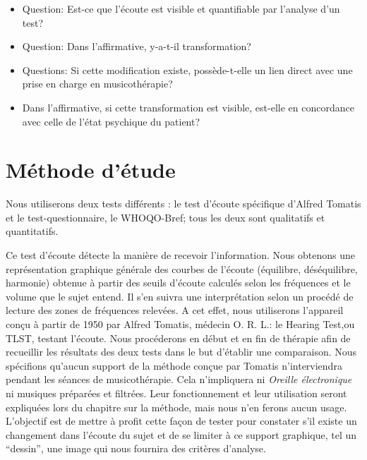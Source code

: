 
 \begin{itemize}
 \item  Question:
   Est-ce que l'écoute est visible et quantifiable par
          l'analyse d'un test?
 
 \end{itemize}
 	
 \begin{itemize}
 \item Question:
   Dans l'affirmative, y-a-t-il transformation?
   
\end{itemize}
 
\begin{itemize}
          
 \item Questions:
   Si cette modification existe, possède-t-elle un lien direct avec une prise en charge
  en musicothérapie?
  
  \item Dans l'affirmative, 
   si cette transformation est visible, est-elle en 
 	concordance 
 	avec celle de l'état psychique du patient?
        
 \end{itemize}

 






 

\section{Méthode d'étude}

	Nous utiliserons deux tests différents : 
	le test d'écoute spécifique d'Alfred Tomatis
	et le test-questionnaire, le WHOQO-Bref; tous les deux sont
        qualitatifs et quantitatifs.

        
        Ce test d'écoute détecte la manière de recevoir
        l'information. Nous obtenons une  
	représentation graphique générale des courbes de l'écoute
        (équilibre, déséquilibre, harmonie) obtenue à partir des seuils d'écoute
        calculés selon les fréquences et le volume que le sujet entend. Il s'en suivra une interprétation
        selon un procédé de lecture des zones de fréquences relevées.
	A cet effet, nous utiliserons l'appareil conçu à partir de 1950 par Alfred Tomatis, médecin
        O. R. L.: le Hearing Test,ou TLST, testant
        l'écoute.
	Nous procéderons en début et en fin de thérapie
        afin de recueillir les résultats des
        deux tests dans le but d'établir une comparaison.
        Nous spécifions qu'aucun support de la méthode conçue par
        Tomatis n'interviendra pendant les séances de musicothérapie.
        Cela n'impliquera ni 
\textsl{Oreille
	électronique} ni musiques préparées et filtrées. Leur
      fonctionnement et leur utilisation seront expliquées lors du
      chapitre sur la méthode, mais nous n'en ferons aucun
      usage. L'objectif est de mettre à profit cette façon de  tester pour constater
      s'il existe un changement dans l'écoute du sujet et de
      se limiter à ce support graphique, tel un ``dessin'',
      une image qui nous fournira des critères d'analyse.
       
